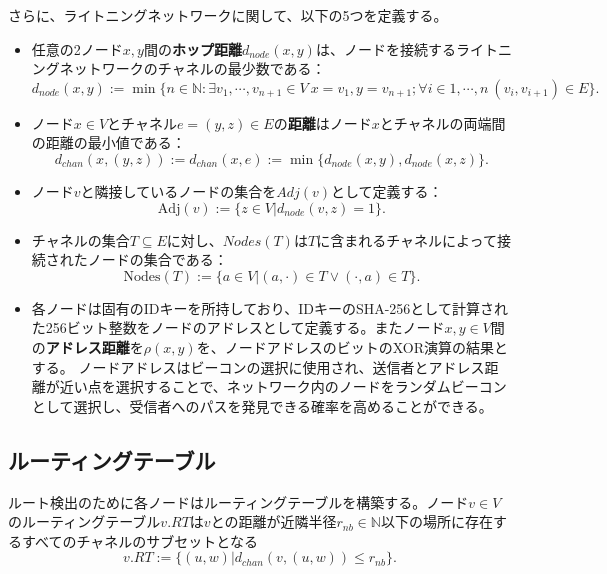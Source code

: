 \documentclass[12pt]{jarticle}
\def\N{\mathbb{N}}
\begin{document}
さらに、ライトニングネットワークに関して、以下の5つを定義する。
\begin{itemize}
\item
任意の2ノード$x,y$間の\textbf{ホップ距離}$d_{node}(x, y)$は、ノードを接続するライトニングネットワークのチャネルの最少数である：
\begin{equation}
d_{node}(x, y) := \min \{ n\in \N : \exists v_1,\cdots,v_{n+1}\in V \ x=v_1,y=v_{n+1};\forall i\in 1,\cdots,n \ (v_i,v_{i+1}) \in E\}.
\end{equation}
\item
ノード$x\in V$とチャネル$e = (y,z)\in E$の\textbf{距離}はノード$x$とチャネルの両端間の距離の最小値である：
\begin{equation}
d_{chan}(x,(y,z)) := d_{chan}(x,e) := \min\{ d_{node}(x,y),d_{node}(x,z) \}.
\end{equation}
\item
ノード$v$と隣接しているノードの集合を$Adj(v)$として定義する：
\begin{equation}
\mbox{Adj}(v) := \{z\in V| d_{node}(v,z) = 1 \}.
\end{equation}
\item
チャネルの集合$T \subseteq E$に対し、$Nodes(T)$は$T$に含まれるチャネルによって接続されたノードの集合である：
\begin{equation}
\mbox{Nodes}(T) := \{a \in V | (a,\cdot) \in T \vee (\cdot, a) \in T \}.
\end{equation}
\item
各ノードは固有のIDキーを所持しており、IDキーのSHA-256\cite{sha256}として計算された256ビット整数をノードのアドレスとして定義する。またノード$x,y\in V$間の\textbf{アドレス距離}を$\rho(x,y)$を、ノードアドレスのビットのXOR演算の結果とする。
ノードアドレスはビーコンの選択に使用され、送信者とアドレス距離が近い点を選択することで、ネットワーク内のノードをランダムビーコンとして選択し、受信者へのパスを発見できる確率を高めることができる。
\end{itemize}

\subsection{ルーティングテーブル}
ルート検出のために各ノードはルーティングテーブルを構築する。ノード$v\in V$のルーティングテーブル$v.RT$は$v$との距離が近隣半径$r_{nb} \in \N$以下の場所に存在するすべてのチャネルのサブセットとなる
\begin{equation*}
v.RT := \{ (u,w)|d_{chan}(v,(u,w)) \leq r_{nb} \}.
\end{equation*}
\end{document}
